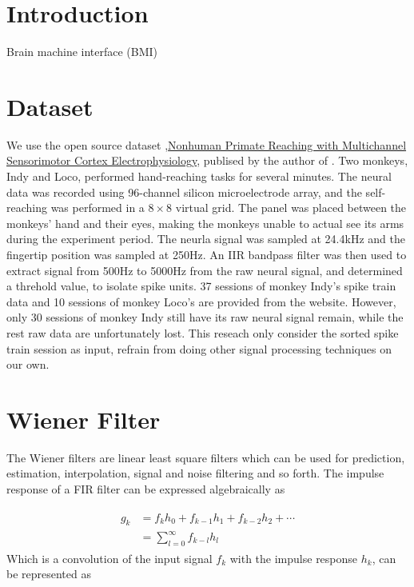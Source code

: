 \documentclass[8pt,a4paper]{article}
\begin{document}
\begin{multicols}{2}

\section*{Introduction}

Brain machine interface (BMI) 

\section*{Dataset}

We use the open source dataset ,\href{https://zenodo.org/record/583331#.XWirEigzZPb}{Nonhuman Primate Reaching with Multichannel Sensorimotor Cortex Electrophysiology}, 
publised by the author of \cite{makin2018}. Two monkeys, Indy and Loco, performed hand-reaching tasks for several minutes. 
The neural data was recorded using 96-channel silicon microelectrode array, and the self-reaching was performed in a  $8 \times 8$ virtual grid. 
The panel was placed between the monkeys' hand and their eyes, making the monkeys unable to actual see its arms during the experiment period. 
The neurla signal was sampled at 24.4kHz and the fingertip position was sampled at 250Hz. 
An IIR bandpass filter was then used to extract signal from 500Hz to 5000Hz from the raw neural signal, and determined a threhold value, to isolate spike units. 
37 sessions of monkey Indy's spike train data and 10 sessions of monkey Loco's are provided from the website.  
However, only 30 sessions of monkey Indy still have its raw neural signal remain, while the rest raw data are unfortunately lost. 
This reseach only consider the sorted spike train session as input, refrain from doing other signal processing techniques on our own.

\section*{Wiener Filter}

The Wiener filters are linear least square filters which can be used for prediction, estimation, interpolation, signal and noise filtering and so forth.\cite{widrow1987}
The impulse response of a FIR filter can be expressed algebraically as 

\begin{align}
  \begin{split}
  g_{k} &= f_{k}h_{0} + f_{k-1}h_{1} + f_{k-2}h_{2} + \cdots \\
        &= \sum_{l=0}^{\infty} f_{k-l}h_{l}
  \end{split}
\end{align}
Which is a convolution of the input signal $f_{k}$ with the impulse response $h_{k}$, can be represented as


\end{multicols}
\end{document}
